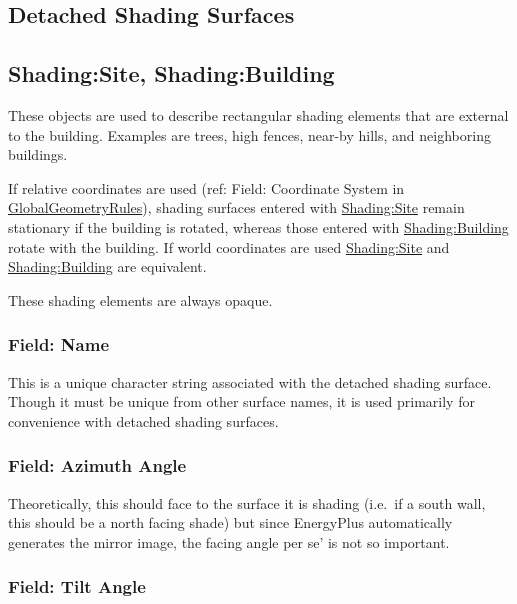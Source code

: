 \subsection{Detached Shading Surfaces}\label{detached-shading-surfaces}

\subsection{Shading:Site, Shading:Building}\label{shadingsite-shadingbuilding}

These objects are used to describe rectangular shading elements that are external to the building. Examples are trees, high fences, near-by hills, and neighboring buildings.

If relative coordinates are used (ref: Field: Coordinate System in \hyperref[globalgeometryrules]{GlobalGeometryRules}), shading surfaces entered with \hyperref[shadingsite-shadingbuilding]{Shading:Site} remain stationary if the building is rotated, whereas those entered with \hyperref[shadingsite-shadingbuilding]{Shading:Building} rotate with the building. If world coordinates are used \hyperref[shadingsite-shadingbuilding]{Shading:Site} and \hyperref[shadingsite-shadingbuilding]{Shading:Building} are equivalent.

These shading elements are always opaque.

\subsubsection{Field: Name}\label{field-name-22-004}

This is a unique character string associated with the detached shading surface. Though it must be unique from other surface names, it is used primarily for convenience with detached shading surfaces.

\subsubsection{Field: Azimuth Angle}\label{field-azimuth-angle-10}

Theoretically, this should face to the surface it is shading (i.e.~if a south wall, this should be a north facing shade) but since EnergyPlus automatically generates the mirror image, the facing angle per se' is not so important.

\subsubsection{Field: Tilt Angle}\label{field-tilt-angle-10}

